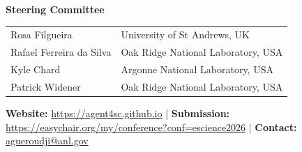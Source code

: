 \documentclass[10pt,a4paper]{article}
\newcommand{\ThinRule}{\noindent{\color{ruleblue}\rule{\linewidth}{0.5pt}}}
\begin{document}
\vspace{10pt}

{\color{navyblue}\large\textbf{Steering Committee}}
\ThinRule\vspace{4pt}

{\small
\begin{tabular}{ll}
  Rosa Filgueira      & University of St Andrews, UK \\[2pt]
  Rafael Ferreira da Silva & Oak Ridge National Laboratory, USA \\[2pt]
  Kyle Chard          & Argonne National Laboratory, USA \\[2pt]
  Patrick Widener     & Oak Ridge National Laboratory, USA \\
\end{tabular}
}

\vfill
\noindent{\color{ruleblue}\rule{\linewidth}{0.5pt}}
\vspace{4pt}
\begin{center}
  {\small\textcolor{midgray}{%
    \textbf{Website:} \url{https://agent4sc.github.io}
    \quad|\quad
    \textbf{Submission:} \url{https://easychair.org/my/conference?conf=escience2026}
    \quad|\quad
    \textbf{Contact:} \href{mailto:agueroudji@anl.gov}{agueroudji@anl.gov}
  }}
\end{center}
\end{document}
